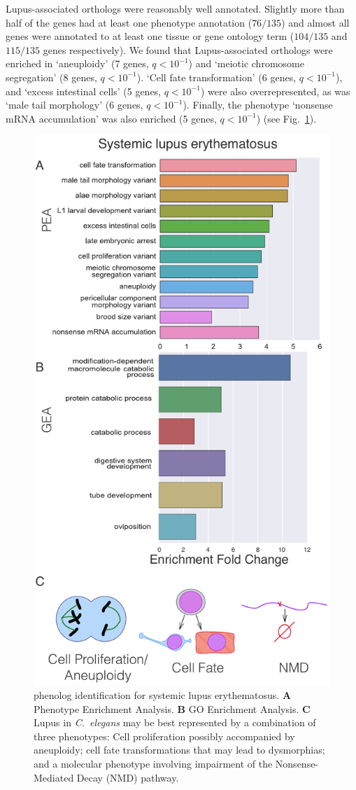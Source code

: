 \documentclass[10pt, onecolumn]{article}
\newcommand{\cel}{\emph{C.~elegans}}
\newcommand{\wlupus}{135}
\newcommand{\qval}[1]{\ensuremath{q<10^{-#1}}}
\begin{document}
Lupus-associated orthologs were reasonably well annotated. Slightly more than
half of the genes had at least one phenotype annotation ($76/\wlupus{}$) and
almost all genes were annotated to at least one tissue or gene ontology term
($104/\wlupus{}$ and $115/\wlupus$ genes respectively). We found that
Lupus-associated orthologs were enriched in `aneuploidy' (7 genes, \qval{1}) and
`meiotic chromosome segregation' (8 genes, \qval{1}). `Cell fate transformation'
(6 genes, \qval{1}), and `excess intestinal cells' (5 genes, \qval{1}) were also
overrepresented, as was `male tail morphology' (6 genes, \qval{1}). Finally, the
phenotype `nonsense mRNA accumulation' was also enriched (5 genes, \qval{1})
(see Fig.~\ref{fig:lupus}).

\begin{figure}[htbp]
  \renewcommand{\familydefault}{\sfdefault}\normalfont{}
  \centering
  \includegraphics[width=.5\linewidth]{systemic-lupus.pdf}
  \caption{phenolog identification for systemic lupus erythematosus.
           \textbf{A} Phenotype Enrichment Analysis. \textbf{B} GO Enrichment
           Analysis. \textbf{C} Lupus in \cel{} may be best represented by
           a combination of three phenotypes: Cell proliferation possibly
           accompanied by aneuploidy; cell fate transformations that may lead
           to dysmorphias; and a molecular phenotype involving impairment of
           the Nonsense-Mediated Decay (NMD) pathway.}
\label{fig:lupus}
\end{figure}
\end{document}

